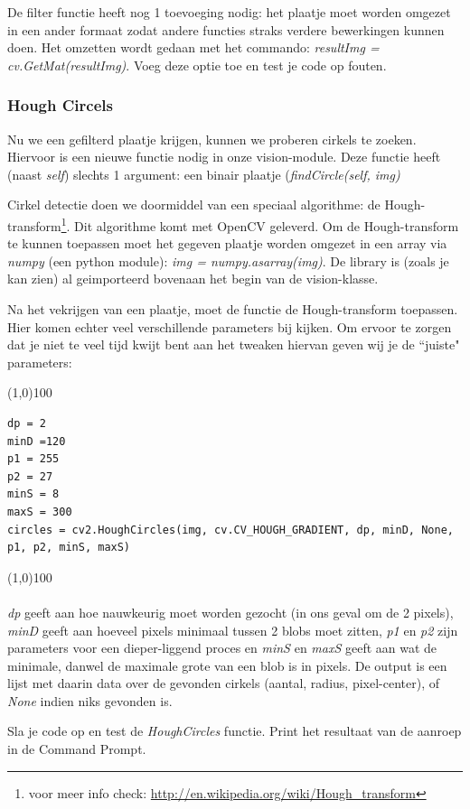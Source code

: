 \documentclass[a4paper, twoside]{article}
\begin{document}
De filter functie heeft nog 1 toevoeging nodig: het plaatje moet worden omgezet in een ander formaat zodat andere functies straks verdere bewerkingen kunnen doen. Het omzetten wordt gedaan met het commando: \textit{resultImg = cv.GetMat(resultImg)}. Voeg deze optie toe en test je code op fouten.

\subsubsection{Hough Circels}

Nu we een gefilterd plaatje krijgen, kunnen we proberen cirkels te zoeken. Hiervoor is een nieuwe functie nodig in onze vision-module. Deze functie heeft (naast \textit{self}) slechts 1 argument: een binair plaatje (\textit{findCircle(self, img)}

Cirkel detectie doen we doormiddel van een speciaal algorithme: de Hough-transform\footnote{voor meer info check: \url{http://en.wikipedia.org/wiki/Hough_transform}}. Dit algorithme komt met OpenCV geleverd. Om de Hough-transform te kunnen toepassen moet het gegeven plaatje worden omgezet in een array via \textit{numpy} (een python module): \textit{img = numpy.asarray(img)}. De library is (zoals je kan zien) al geimporteerd bovenaan het begin van de vision-klasse.

Na het vekrijgen van een plaatje, moet de functie de Hough-transform toepassen. Hier komen echter veel verschillende parameters bij kijken. Om ervoor te zorgen dat je niet te veel tijd kwijt bent aan het tweaken hiervan geven wij je de ``juiste" parameters:

\noindent \line(1,0){100}
\begin{verbatim}
dp = 2
minD =120
p1 = 255
p2 = 27
minS = 8
maxS = 300
circles = cv2.HoughCircles(img, cv.CV_HOUGH_GRADIENT, dp, minD, None, p1, p2, minS, maxS)
\end{verbatim}
\noindent \line(1,0){100}
\\\\
\textit{dp} geeft aan hoe nauwkeurig moet worden gezocht (in ons geval om de 2 pixels), \textit{minD} geeft aan hoeveel pixels minimaal tussen 2 blobs moet zitten, \textit{p1} en \textit{p2} zijn parameters voor een dieper-liggend proces en \textit{minS} en \textit{maxS} geeft aan wat de minimale, danwel de maximale grote van een blob is in pixels.
De output is een lijst met daarin data over de gevonden cirkels (aantal, radius, pixel-center), of \textit{None} indien niks gevonden is.

Sla je code op en test de \textit{HoughCircles} functie. Print het resultaat van de aanroep in de Command Prompt. 
\end{document}
